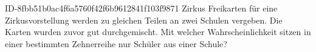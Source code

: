 \begin{exercise}
      {ID-8fbb51b0ac4f6a5760f42f6b9612841f103f9871}
      {Zirkus}
  \ifproblem{} Freikarten für eine Zirkusvorstellung werden zu gleichen Teilen an zwei
    Schulen vergeben. Die Karten wurden zuvor gut durchgemischt. Mit welcher
    Wahrscheinlichkeit sitzen in einer bestimmten Zehnerreihe nur Schüler
    aus einer Schule?
  \fi
\end{exercise}
